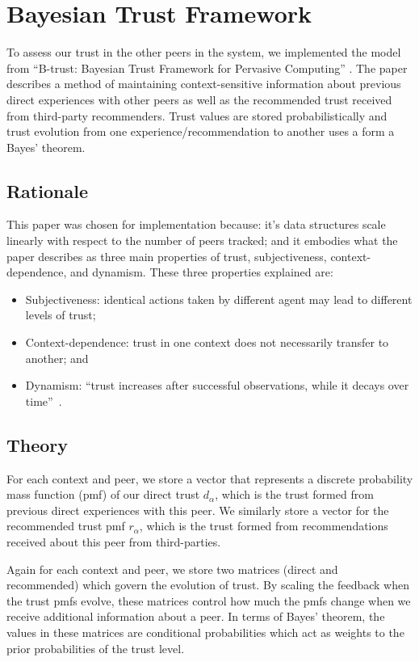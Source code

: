 \section{Bayesian Trust Framework}
To assess our trust in the other peers in the system, we implemented
the model from ``B-trust: Bayesian Trust Framework for Pervasive Computing''
\cite{btrust}. The paper describes a method of maintaining context-sensitive
information about previous direct experiences with other peers as well as
the recommended trust received from third-party recommenders. Trust values
are stored probabilistically and trust evolution from one
experience/recommendation to another uses a form a Bayes' theorem.

\subsection{Rationale}
This paper was chosen for implementation because: it's data structures scale
linearly with respect to the number of peers tracked; and it embodies what
the paper describes as three main properties of trust, subjectiveness,
context-dependence, and dynamism. These three properties explained are:
\begin{itemize}
  \item Subjectiveness: identical actions taken by different agent may lead to
  different levels of trust;
  \item Context-dependence: trust in one context does not necessarily transfer
  to another; and
  \item Dynamism: ``trust increases after successful observations, while it
  decays over time''~\cite{btrust}.
\end{itemize}


\subsection{Theory}
For each context and peer, we store a vector that represents a discrete
probability mass function (pmf) of our direct trust $d_\alpha$, which is the
trust formed from previous direct experiences with this peer. We similarly store a
vector for the recommended trust pmf $r_\alpha$, which is the trust formed from
recommendations received about this peer from third-parties.

Again for each context and peer, we store two matrices (direct and recommended)
which govern the evolution of trust. By scaling the feedback when the trust
pmfs evolve, these matrices control how much the pmfs change when we receive
additional information about a peer. In terms of Bayes' theorem, the
values in these matrices are conditional probabilities which act as weights
to the prior probabilities of the trust level.

